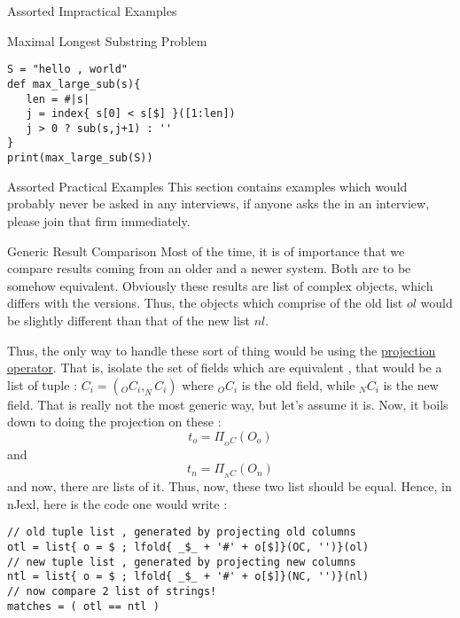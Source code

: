 \begin{section}{Assorted Impractical Examples}
\begin{subsection}{Maximal Longest Substring Problem}
\begin{center}\begin{minipage}{\linewidth}
\begin{lstlisting}[style=JexlStyle]
S = "hello , world"
def max_large_sub(s){
   len = #|s|
   j = index{ s[0] < s[$] }([1:len])
   j > 0 ? sub(s,j+1) : ''  
}
print(max_large_sub(S))
\end{lstlisting}  
\end{minipage}\end{center} 
\end{subsection}

\end{section}




\begin{section}{Assorted Practical Examples}
This section contains examples which would probably never be asked in any interviews,
if anyone asks the in an interview, please join that firm immediately.

\begin{subsection}{Generic Result Comparison}
Most of the time, it is of importance that we compare results coming from an 
older and a newer system. Both are to be somehow equivalent.
Obviously these results are list of complex objects, which differs with the versions.
Thus, the objects which comprise of the old list $ol$ would be slightly different 
than that of the new list $nl$. 

Thus, the only way to handle these sort of thing would be using the 
\href{https://en.wikipedia.org/wiki/Projection\_(relational\_algebra)}{projection operator}.
That is, isolate the set of fields which are equivalent , that would be a list of tuple :
$C_i = ( _OC_i,_NC_i )$ where $_OC_i$ is the old field, while $_NC_i$ is the new field.
That is really not the most generic way, but let's assume it is.
Now, it boils down to doing the projection on these :
$$
t_o = \Pi_{ _OC }(O_o) 
$$ 
and
$$
t_n = \Pi_{ _NC }(O_n)
$$ 
and now, there are lists of it. Thus, now, these two list should be equal.
Hence, in nJexl, here is the code one would write :

\begin{center}\begin{minipage}{\linewidth}
\begin{lstlisting}[style=JexlStyle]
// old tuple list , generated by projecting old columns 
otl = list{ o = $ ; lfold{ _$_ + '#' + o[$]}(OC, '')}(ol)
// new tuple list , generated by projecting new columns 
ntl = list{ o = $ ; lfold{ _$_ + '#' + o[$]}(NC, '')}(nl)
// now compare 2 list of strings!
matches = ( otl == ntl )  
\end{lstlisting}  
\end{minipage}\end{center}
\end{subsection}


\end{section}
